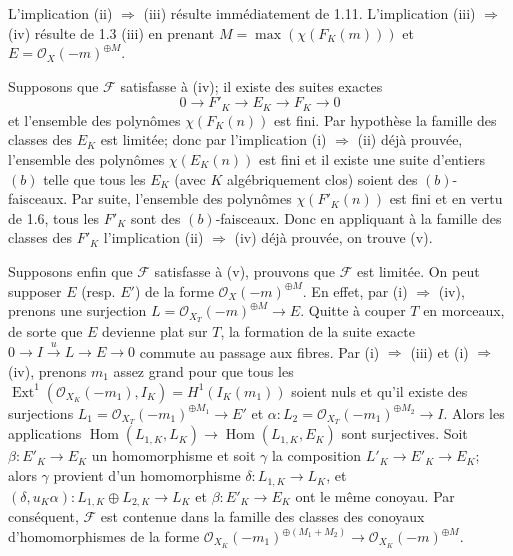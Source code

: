 L'implication (ii) \(\Rightarrow\) (iii) résulte immédiatement de 1.11. L'implication (iii) \(\Rightarrow\) (iv) résulte de 1.3 (iii) en prenant \(M=\max(\chi(F_K(m)))\) et \(E=\mathcal O_X(-m)^{\oplus M}\).

Supposons que \(\mathcal F\) satisfasse à (iv); il existe des suites exactes
\[
0\longrightarrow F'_K\longrightarrow E_K\longrightarrow F_K\longrightarrow0
\]
et l'ensemble des polynômes \(\chi(F_K(n))\) est fini. Par hypothèse la famille des classes des \(E_K\) est limitée; donc par l'implication (i) \(\Rightarrow\) (ii) déjà prouvée, l'ensemble des polynômes \(\chi(E_K(n))\) est fini et il existe une suite d'entiers \((b)\) telle que tous les \(E_K\) (avec \(K\) algébriquement clos) soient des \((b)\)-faisceaux. Par suite, l'ensemble des polynômes \(\chi(F'_K(n))\) est fini et en vertu de 1.6, tous les \(F'_K\) sont des \((b)\)-faisceaux. Donc en appliquant à la famille des classes des \(F'_K\) l'implication (ii) \(\Rightarrow\) (iv) déjà prouvée, on trouve (v).

Supposons enfin que \(\mathcal F\) satisfasse à (v), prouvons que \(\mathcal F\) est limitée. On peut supposer \(E\) (resp. \(E'\)) de la forme \(\mathcal O_X(-m)^{\oplus M}\). En effet, par (i) \(\Rightarrow\) (iv),
prenons une surjection \(L=\mathcal O_{X_T}(-m)^{\oplus M}\longrightarrow E\). Quitte à couper \(T\) en morceaux, de sorte que \(E\) devienne plat sur \(T\), la formation de la suite exacte \(0\longrightarrow I\xrightarrow{u}L\longrightarrow E\longrightarrow0\) commute au passage aux fibres. Par (i) \(\Rightarrow\) (iii) et (i) \(\Rightarrow\) (iv), prenons \(m_1\) assez grand pour que tous les \(\operatorname{Ext}^1(\mathcal O_{X_K}(-m_1),I_K)=H^1(I_K(m_1))\) soient nuls et qu'il existe des surjections \(L_1=\mathcal O_{X_T}(-m_1)^{\oplus M_1}\longrightarrow E'\) et \(\alpha:L_2=\mathcal O_{X_T}(-m_1)^{\oplus M_2}\longrightarrow I\). Alors les applications \(\operatorname{Hom}(L_{1,K},L_K)\longrightarrow \operatorname{Hom}(L_{1,K},E_K)\) sont surjectives. Soit \(\beta:E'_K\to E_K\) un homomorphisme et soit \(\gamma\) la composition \(L'_K\to E'_K\to E_K\); alors \(\gamma\) provient d'un homomorphisme \(\delta:L_{1,K}\to L_K\), et $(\delta,u_K\alpha):L_{1,K}\oplus L_{2,K}\longrightarrow L_K$ et \(\beta:E'_K\to E_K\) ont le même conoyau. Par conséquent, \(\mathcal F\) est contenue dans la famille des classes des conoyaux d'homomorphismes de la forme \(\mathcal O_{X_K}(-m_1)^{\oplus(M_1+M_2)}\longrightarrow \mathcal O_{X_K}(-m)^{\oplus M}\).

